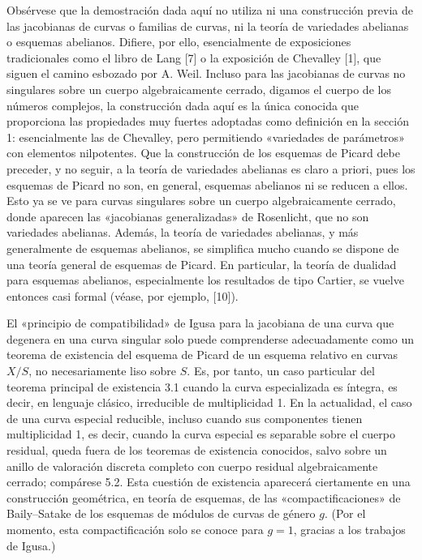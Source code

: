  Obsérvese que la demostración dada aquí no utiliza ni
una construcción previa de las jacobianas de curvas o familias de curvas, ni la
teoría de variedades abelianas o esquemas abelianos. Difiere, por ello,
esencialmente de exposiciones tradicionales como el libro de Lang [7] o la
exposición de Chevalley [1], que siguen el camino esbozado por A. Weil. Incluso
para las jacobianas de curvas no singulares sobre un cuerpo algebraicamente
cerrado, digamos el cuerpo de los números complejos, la construcción dada aquí
es la única conocida que proporciona las propiedades muy fuertes adoptadas
como definición en la sección 1: esencialmente las de Chevalley, pero permitiendo
«variedades de parámetros» con elementos nilpotentes. Que la construcción de
los esquemas de Picard debe preceder, y no seguir, a la teoría de variedades
abelianas es claro a priori, pues los esquemas de Picard no son, en general,
esquemas abelianos ni se reducen a ellos. Esto ya se ve para curvas singulares
sobre un cuerpo algebraicamente cerrado, donde aparecen las «jacobianas
generalizadas» de Rosenlicht, que no son variedades abelianas. Además, la
teoría de variedades abelianas, y más generalmente de esquemas abelianos, se
simplifica mucho cuando se dispone de una teoría general de esquemas de Picard.
En particular, la teoría de dualidad para esquemas abelianos, especialmente los
resultados de tipo Cartier, se vuelve entonces casi formal (véase, por ejemplo,
[10]).

 El «principio de compatibilidad» de Igusa para la
jacobiana de una curva que degenera en una curva singular solo puede
comprenderse adecuadamente como un teorema de existencia del esquema de Picard
de un esquema relativo en curvas $X/S$, no necesariamente liso sobre $S$. Es,
por tanto, un caso particular del teorema principal de existencia 3.1 cuando la
curva especializada es íntegra, es decir, en lenguaje clásico, irreducible de
multiplicidad 1. En la actualidad, el caso de una curva especial reducible,
incluso cuando sus componentes tienen multiplicidad 1, es decir, cuando la
curva especial es separable sobre el cuerpo residual, queda fuera de los
teoremas de existencia conocidos, salvo sobre un anillo de valoración discreta
completo con cuerpo residual algebraicamente cerrado; compárese 5.2. Esta
cuestión de existencia aparecerá ciertamente en una construcción geométrica, en
teoría de esquemas, de las «compactificaciones» de Baily--Satake de los esquemas
de módulos de curvas de género $g$. (Por el momento, esta compactificación solo
se conoce para $g=1$, gracias a los trabajos de Igusa.)

